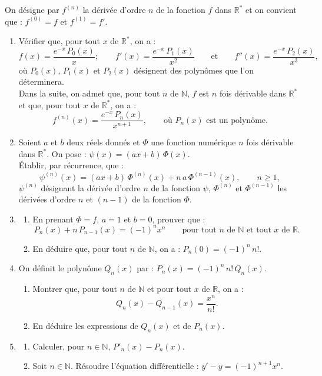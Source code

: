 \documentclass{axiobac}
\begin{document}
\begin{probleme}{}
On désigne par $f^{(n)}$ la dérivée d'ordre $n$ de la fonction $f$ dans $\mathbb{R}^*$ et on convient que : $f^{(0)} = f$ et $f^{(1)} = f'$.

\begin{enumerate}
    \item Vérifier que, pour tout $x$ de $\mathbb{R}^*$, on a :
    \[
    f(x) = \frac{e^{-x}\,P_0(x)}{x} ; \qquad f'(x) = \frac{e^{-x}\,P_1(x)}{x^2} \qquad \text{et} \qquad f''(x) = \frac{e^{-x}\,P_2(x)}{x^3},
    \]
    où $P_0(x)$, $P_1(x)$ et $P_2(x)$ désignent des polynômes que l'on déterminera. \\
    Dans la suite, on admet que, pour tout $n$ de $\mathbb{N}$, $f$ est $n$ fois dérivable dans $\mathbb{R}^*$ et que, pour tout $x$ de $\mathbb{R}^*$, on a :
    \[
    f^{(n)}(x) = \frac{e^{-x}\,P_n(x)}{x^{n+1}}, \qquad \text{où } P_n(x) \text{ est un polynôme.}
    \]
    \item Soient $a$ et $b$ deux réels donnés et $\Phi$ une fonction numérique $n$ fois dérivable dans $\mathbb{R}^*$. On pose : $\psi(x) = (ax + b)\,\Phi(x)$. \\
    Établir, par récurrence, que :
    \[
    \psi^{(n)}(x) = (ax + b)\,\Phi^{(n)}(x) + n\,a\,\Phi^{(n-1)}(x), \qquad n \geqslant 1,
    \]
    $\psi^{(n)}$ désignant la dérivée d'ordre $n$ de la fonction $\psi$, $\Phi^{(n)}$ et $\Phi^{(n-1)}$ les dérivées d'ordre $n$ et $(n-1)$ de la fonction $\Phi$.
    \item
    \begin{enumerate}
        \item En prenant $\Phi = f$, $a = 1$ et $b = 0$, prouver que :
        \[
        P_n(x) + n\,P_{n-1}(x) = (-1)^n x^n \qquad \text{pour tout } n \text{ de } \mathbb{N} \text{ et tout } x \text{ de } \mathbb{R} .
        \]
        \item En déduire que, pour tout $n$ de $\mathbb{N}$, on a : $P_n(0) = (-1)^n\, n!$.
    \end{enumerate}
    \item On définit le polynôme $Q_n(x)$ par : $P_n(x) = (-1)^n\, n!\, Q_n(x)$.
    \begin{enumerate}
        \item Montrer que, pour tout $n$ de $\mathbb{N}$ et pour tout $x$ de $\mathbb{R}$, on a :
        \[
        Q_n(x) - Q_{n-1}(x) = \frac{x^n}{n!} .
        \]
        \item En déduire les expressions de $Q_n(x)$ et de $P_n(x)$.
    \end{enumerate}
    \item
    \begin{enumerate}
        \item Calculer, pour $n \in \mathbb{N}$, $P'_n(x) - P_n(x)$.
        \item Soit $n \in \mathbb{N}$. Résoudre l'équation différentielle : $y' - y = (-1)^{n+1} x^n$.
    \end{enumerate}
\end{enumerate}

\end{probleme}
\end{document}
